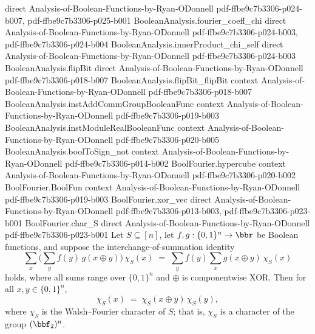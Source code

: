 \begin{lemma}
  {direct}
  {Analysis-of-Boolean-Functions-by-Ryan-ODonnell}
  {pdf-ffbe9c7b3306-p024-b007,
    pdf-ffbe9c7b3306-p025-b001}
\proofstep
  {BooleanAnalysis.fourier_coeff_chi}
  {direct}
  {Analysis-of-Boolean-Functions-by-Ryan-ODonnell}
  {pdf-ffbe9c7b3306-p024-b003,
    pdf-ffbe9c7b3306-p024-b004}
\proofstep
  {BooleanAnalysis.innerProduct_chi_self}
  {direct}
  {Analysis-of-Boolean-Functions-by-Ryan-ODonnell}
  {pdf-ffbe9c7b3306-p024-b003}
\proofstep
  {BooleanAnalysis.flipBit}
  {direct}
  {Analysis-of-Boolean-Functions-by-Ryan-ODonnell}
  {pdf-ffbe9c7b3306-p018-b007}
\proofstep
  {BooleanAnalysis.flipBit_flipBit}
  {context}
  {Analysis-of-Boolean-Functions-by-Ryan-ODonnell}
  {pdf-ffbe9c7b3306-p018-b007}
\proofstep
  {BooleanAnalysis.instAddCommGroupBooleanFunc}
  {context}
  {Analysis-of-Boolean-Functions-by-Ryan-ODonnell}
  {pdf-ffbe9c7b3306-p019-b003}
\proofstep
  {BooleanAnalysis.instModuleRealBooleanFunc}
  {context}
  {Analysis-of-Boolean-Functions-by-Ryan-ODonnell}
  {pdf-ffbe9c7b3306-p020-b005}
\proofstep
  {BooleanAnalysis.boolToSign_not}
  {context}
  {Analysis-of-Boolean-Functions-by-Ryan-ODonnell}
  {pdf-ffbe9c7b3306-p014-b002}
\proofstep
  {BoolFourier.hypercube}
  {context}
  {Analysis-of-Boolean-Functions-by-Ryan-ODonnell}
  {pdf-ffbe9c7b3306-p020-b002}
\proofstep
  {BoolFourier.BoolFun}
  {context}
  {Analysis-of-Boolean-Functions-by-Ryan-ODonnell}
  {pdf-ffbe9c7b3306-p019-b003}
\proofstep
  {BoolFourier.xor_vec}
  {direct}
  {Analysis-of-Boolean-Functions-by-Ryan-ODonnell}
  {pdf-ffbe9c7b3306-p013-b003,
    pdf-ffbe9c7b3306-p023-b001}
\proofstep
  {BoolFourier.char_S}
  {direct}
  {Analysis-of-Boolean-Functions-by-Ryan-ODonnell}
  {pdf-ffbe9c7b3306-p023-b001}
Let $S \subseteq [n]$, let $f, g : \{0,1\}^n \to \bbr$ be Boolean functions, and suppose
the interchange-of-summation identity
\[
  \sum_{x} \Big(\sum_{y} f(y)\, g(x \oplus y)\Big)\,\chi_S(x)
  \;=\; \sum_{y} f(y) \sum_{x} g(x \oplus y)\,\chi_S(x)
\]
holds, where all sums range over $\{0,1\}^n$ and $\oplus$ is componentwise XOR. Then for
all $x, y \in \{0,1\}^n$,
\[
  \chi_S(x) \;=\; \chi_S(x \oplus y)\,\chi_S(y),
\]
where $\chi_S$ is the Walsh--Fourier character of $S$; that is, $\chi_S$ is a character
of the group $(\bbf_2)^n$.
\end{lemma}

